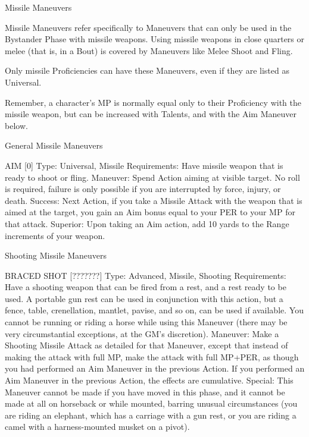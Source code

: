 \documentclass[oneside,11pt,english]{book}
\begin{document}
 

 

Missile Maneuvers 

 

Missile Maneuvers refer specifically to Maneuvers that can only be used in the Bystander Phase with 
missile weapons. Using missile weapons in close quarters or melee (that is, in a Bout) is covered by 
Maneuvers like Melee Shoot and Fling. 


 

Only missile Proficiencies can have these Maneuvers, even if they are listed as Universal. 

 

Remember, a character’s MP is normally equal only to their Proficiency with the missile weapon, but can 
be increased with Talents, and with the Aim Maneuver below. 

 

 

General Missile Maneuvers 

 

AIM [0] 
Type: Universal, Missile 
Requirements: Have missile weapon that is ready to shoot or fling. 
Maneuver: Spend Action aiming at visible target. No roll is required, failure is only possible if you are 
interrupted by force, injury, or death. 
Success: Next Action, if you take a Missile Attack with the weapon that is aimed at the target, you gain 
an Aim bonus equal to your PER to your MP for that attack. 
Superior: Upon taking an Aim action, add 10 yards to the Range increments of your weapon. 

 

 

Shooting Missile Maneuvers 

 

BRACED SHOT [???????] 
Type: Advanced, Missile, Shooting 
Requirements: Have a shooting weapon that can be fired from a rest, and a rest ready to be used. A 
portable gun rest can be used in conjunction with this action, but a fence, table, crenellation, mantlet, 
pavise, and so on, can be used if available. You cannot be running or riding a horse while using this 
Maneuver (there may be very circumstantial exceptions, at the GM’s discretion). 
Maneuver: Make a Shooting Missile Attack as detailed for that Maneuver, except that instead of making 
the attack with full MP, make the attack with full MP+PER, as though you had performed an Aim 
Maneuver in the previous Action. If you performed an Aim Maneuver in the previous Action, the effects 
are cumulative. 
Special: This Maneuver cannot be made if you have moved in this phase, and it cannot be made at all on 
horseback or while mounted, barring unusual circumstances (you are riding an elephant, which has a 
carriage with a gun rest, or you are riding a camel with a harness-mounted musket on a pivot). 
\end{document}
